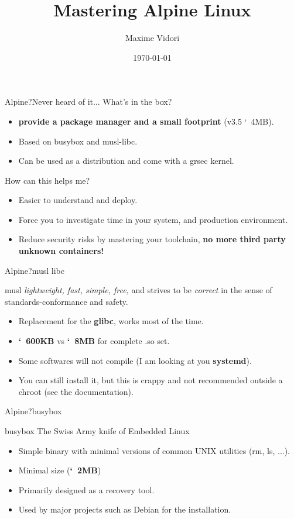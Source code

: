 \documentclass{beamer}
\title{Mastering Alpine Linux}
\date{\today}
\author{Maxime Vidori}
\begin{document}
\begin{frame}
  \titlepage
\end{frame}


\begin{frame}{Alpine?}{Never heard of it...}
  What's in the box?
  \begin{itemize}
    \item \textbf{provide a package manager and a small footprint} (v3.5 \char`~4MB).
    \item Based on busybox and musl-libc.
    \item Can be used as a distribution and come with a grsec kernel.
  \end{itemize}
  How can this helps me?
  \begin{itemize}
    \item Easier to understand and deploy.
    \item Force you to investigate time in your system, and production
      environment.
    \item Reduce security risks by mastering your toolchain,
      \textbf{no more third party unknown containers!}
  \end{itemize}
\end{frame}

\begin{frame}{Alpine?}{musl libc}
  \begin{block}{musl}
    \textit{lightweight, fast, simple, free,} and strives to be
    \textit{correct} in the sense of standards-conformance and safety.
    \end{block}
  \begin{itemize}
    \item Replacement for the \textbf{glibc}, works most of the time.
    \item \textbf{\char`~600KB} vs \textbf{\char`~8MB} for complete .so set.
    \item Some softwares will not compile (I am looking at you \textbf{systemd}).
  \item You can still install it, but this is crappy and not
      recommended outside a chroot (see the documentation).
  \end{itemize}
\end{frame}

\begin{frame}{Alpine?}{busybox}
  \begin{block}{busybox}
    The Swiss Army knife of Embedded Linux
  \end{block}
  \begin{itemize}
    \item Simple binary with minimal versions of common UNIX utilities
      (rm, ls, ...).
    \item Minimal size (\textbf{\char`~2MB})
    \item Primarily designed as a recovery tool.
    \item Used by major projects such as Debian for the installation.
  \end{itemize}
\end{frame}
\end{document}
